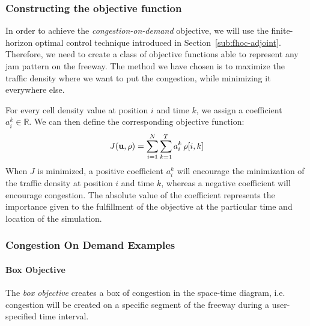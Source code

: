 \subsubsection{Constructing the objective function}
In order to achieve the \emph{congestion-on-demand} objective, we will use the finite-horizon optimal control technique introduced in Section~\ref{sub:fhoc-adjoint}. Therefore, we need to create a class of objective functions able to represent any jam pattern on the freeway. The method we have chosen is to maximize the traffic density where we want to put the congestion, while minimizing it everywhere else.

For every cell density value at position $i$ and time $k$, we assign a coefficient $a_i^k \in \mathbb{R}$. We can then define the corresponding objective function:
\begin{equation}
\label{eqn:jamondemand}
J \left( \vectorize{u}, \vectorize{\rho} \right) = \sum_{i = 1}^{N} \sum_{k = 1}^{T} a_i^k \, \rho\left[i,k\right]
\end{equation}
When $J$ is minimized, a positive coefficient $a_i^k$ will encourage the minimization of the traffic density at position $i$ and time $k$, whereas a negative coefficient will encourage congestion. The absolute value of the coefficient represents the importance given to the fulfillment of the objective at the particular time and location of the simulation.

\subsubsection{Congestion On Demand Examples}

\paragraph{Box Objective}
The \emph{box objective} creates a box of congestion in the space-time diagram, i.e. congestion will be created on a specific segment of the freeway during a user-specified time interval.



